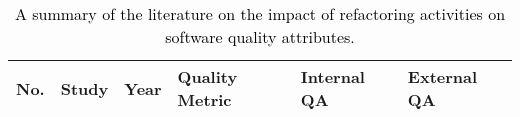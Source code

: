 

\begin{table*}
  \centering
	 \caption{\textcolor{black}{A summary of the literature on the impact of refactoring activities on software quality attributes.}}
	 \label{Table:Quality Metrics in Related Work}
\begin{adjustbox}{width=1.6\textwidth,center}
\begin{tabular}{llllll}\hline
\toprule
 \bfseries No. & \bfseries Study & \bfseries Year & \bfseries Quality Metric & \bfseries Internal QA & \bfseries External QA  \\
\midrule


\end{tabular}
\end{adjustbox}
\end{table*}
